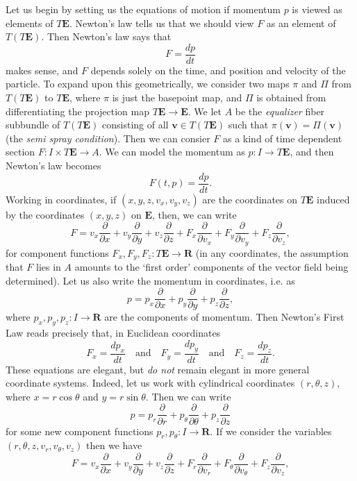 Let us begin by setting us the equations of motion if momentum $p$ is viewed as elements of $T \mathbf{E}$. Newton's law tells us that we should view $F$ as an element of $T(T \mathbf{E})$. Then Newton's law says that
%
\[ F = \frac{dp}{dt} \]
%
makes sense, and $F$ depends solely on the time, and position and velocity of the particle. To expand upon this geometrically, we consider two maps $\pi$ and $\Pi$ from $T(T \mathbf{E})$ to $T \mathbf{E}$, where $\pi$ is just the basepoint map, and $\Pi$ is obtained from differentiating the projection map $T \mathbf{E} \to \mathbf{E}$. We let $A$ be the \emph{equalizer} fiber subbundle of $T(T\mathbf{E})$ consisting of all $\mathbf{v} \in T(T\mathbf{E})$ such that $\pi(\mathbf{v}) = \Pi(\mathbf{v})$ (the \emph{semi spray condition}). Then we can consier $F$ as a kind of time dependent section $F: I \times T \mathbf{E} \to A$. We can model the momentum as $p: I \to T \mathbf{E}$, and then Newton's law becomes
%
\[ F(t,p) = \frac{dp}{dt}. \]
%
Working in coordinates, if $(x,y,z,v_x,v_y,v_z)$ are the coordinates on $T\mathbf{E}$ induced by the coordinates $(x,y,z)$ on $\mathbf{E}$, then, we can write
%
\[ F = v_x \frac{\partial}{\partial x} + v_y \frac{\partial}{\partial y} + v_z \frac{\partial}{\partial z} + F_x \frac{\partial}{\partial v_x} + F_y \frac{\partial}{\partial v_y} + F_z \frac{\partial}{\partial v_z}, \]
%
for component functions $F_x,F_y,F_z: T \mathbf{E} \to \mathbf{R}$ (in any coordinates, the assumption that $F$ lies in $A$ amounts to the `first order' components of the vector field being determined). Let us also write the momentum in coordinates, i.e. as
%
\[ p = p_x \frac{\partial}{\partial x} + p_y \frac{\partial}{\partial y} + p_z \frac{\partial}{\partial z}, \]
%
where $p_x,p_y,p_z: I \to \mathbf{R}$ are the components of momentum. Then Newton's First Law reads precisely that, in Euclidean coordinates
%
\[ F_x = \frac{d p_x}{dt} \quad\text{and}\quad F_y = \frac{d p_y}{d t} \quad\text{and}\quad F_z = \frac{d p_z}{dt}. \]
%
These equations are elegant, but \emph{do not} remain elegant in more general coordinate systems. Indeed, let us work with cylindrical coordinates $(r,\theta,z)$, where $x = r \cos \theta$ and $y = r \sin \theta$. Then we can write
%
\[ p = p_r \frac{\partial}{\partial r} + p_\theta \frac{\partial}{\partial \theta} + p_z \frac{\partial}{\partial z} \]
%
for some new component functions $p_r,p_\theta: I \to \mathbf{R}$. If we consider the variables $(r,\theta,z,v_r,v_\theta,v_z)$ then we have
%
\[ F = v_x \frac{\partial}{\partial x} + v_y \frac{\partial}{\partial y} + v_z \frac{\partial}{\partial z} + F_r \frac{\partial}{\partial v_r} + F_\theta \frac{\partial}{\partial v_\theta} + F_z \frac{\partial}{\partial v_z}, \]
